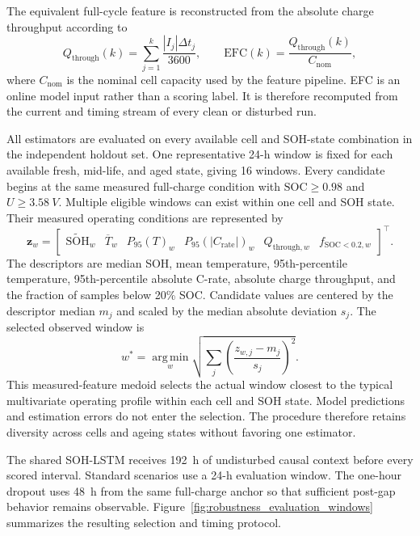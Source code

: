 The equivalent full-cycle feature is reconstructed from the absolute charge throughput according to
\begin{equation}
    Q_{\mathrm{through}}(k)=\sum_{j=1}^{k}\frac{|I_j|\Delta t_j}{3600},
    \qquad
    \mathrm{EFC}(k)=\frac{Q_{\mathrm{through}}(k)}{C_{\mathrm{nom}}},
    \label{eq:robustness_efc}
\end{equation}
where $C_{\mathrm{nom}}$ is the nominal cell capacity used by the feature pipeline. EFC is an online model input rather than a scoring label. It is therefore recomputed from the current and timing stream of every clean or disturbed run.

All estimators are evaluated on every available cell and SOH-state combination in the independent holdout set. One representative 24-h window is fixed for each available fresh, mid-life, and aged state, giving 16 windows. Every candidate begins at the same measured full-charge condition with $\mathrm{SOC}\geq0.98$ and $U\geq\SI{3.58}{V}$. Multiple eligible windows can exist within one cell and SOH state. Their measured operating conditions are represented by
\begin{equation}
    \mathbf{z}_w=
    \begin{bmatrix}
        \widetilde{\mathrm{SOH}}_w &
        \overline{T}_w &
        P_{95}(T)_w &
        P_{95}(|C_{\mathrm{rate}}|)_w &
        Q_{\mathrm{through},w} &
        f_{\mathrm{SOC}<0.2,w}
    \end{bmatrix}^{\top}.
    \label{eq:robustness_window_descriptor}
\end{equation}
The descriptors are median SOH, mean temperature, 95th-percentile temperature, 95th-percentile absolute C-rate, absolute charge throughput, and the fraction of samples below 20\% SOC. Candidate values are centered by the descriptor median $m_j$ and scaled by the median absolute deviation $s_j$. The selected observed window is
\begin{equation}
    w^{*}=\operatorname*{arg\,min}_{w}
    \sqrt{\sum_j\left(\frac{z_{w,j}-m_j}{s_j}\right)^2}.
    \label{eq:robustness_window_medoid}
\end{equation}
This measured-feature medoid selects the actual window closest to the typical multivariate operating profile within each cell and SOH state. Model predictions and estimation errors do not enter the selection. The procedure therefore retains diversity across cells and ageing states without favoring one estimator.

The shared SOH-LSTM receives 192~h of undisturbed causal context before every scored interval. Standard scenarios use a 24-h evaluation window. The one-hour dropout uses 48~h from the same full-charge anchor so that sufficient post-gap behavior remains observable. Figure~\ref{fig:robustness_evaluation_windows} summarizes the resulting selection and timing protocol.

